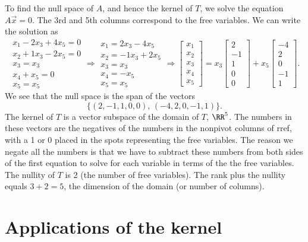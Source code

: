\begin{example}
To find the null space of $A$, and hence the kernel of $T$, we solve the equation $A\vec x=0$.  The 3rd and 5th columns correspond to the free variables.  We can write the solution as 
$$
\begin{matrix}
x_1-2x_3+4x_5=0\\
x_2+1x_3-2x_5=0\\
x_3=x_3\\
x_4+x_5=0\\
x_5=x_5
\end{matrix}
\Rightarrow
\begin{matrix}
x_1=2x_3-4x_5\\
x_2=-1x_3+2x_5\\
x_3=x_3\\
x_4=-x_5\\
x_5=x_5
\end{matrix}
\Rightarrow
\begin{bmatrix}
x_1\\
x_2\\
x_3\\
x_4\\
x_5
\end{bmatrix}=
x_3
\begin{bmatrix}
2\\
-1\\
1\\
0\\
0
\end{bmatrix}+
x_5
\begin{bmatrix}
-4\\
2\\
0\\
-1\\
1
\end{bmatrix}.
$$
We see that the null space is the span of the vectors $$\{(2,-1,1,0,0),\,(-4,2,0,-1,1)\}.$$ 
The kernel of $T$ is a vector subspace of the domain of $T$, ${\RR}^5$.
The numbers in these vectors are the negatives of the numbers in the nonpivot columns of rref, with a 1 or 0 placed in the spots representing the free variables.  
The reason we negate all the numbers is that we have to subtract these numbers from both sides of the first equation to solve for each variable in terms of the the free variables.  
The nullity of $T$ is 2 (the number of free variables). 
The rank plus the nullity equals $3+2=5$, the dimension of the domain (or number of columns).
\end{example}

\section{Applications of the kernel}




